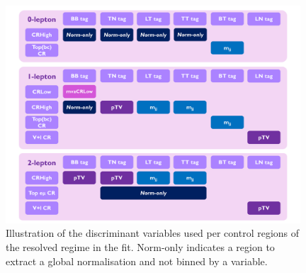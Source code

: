 \begin{figure}[h!]
  \center
  \includegraphics[width=0.98\textwidth]{Images/VH/Discriminants/Variables.pdf}
  \caption{Illustration of the discriminant variables used per control regions of the resolved regime in the fit. Norm-only indicates a region to extract a global normalisation and not binned by a variable.} %
  \label{fig:variablesControlReg}
\end{figure}

